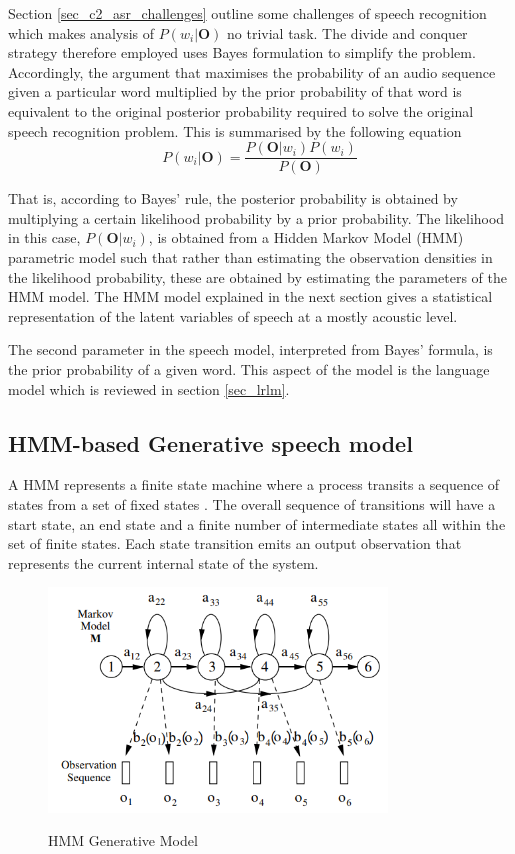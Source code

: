 Section \ref{sec_c2_asr_challenges} outline some challenges of  speech recognition which makes  analysis of $P(w_i|\mathbf{O})$ no trivial task.  The divide and conquer strategy therefore employed uses Bayes formulation to simplify the problem.  Accordingly, the argument that maximises the probability of an audio sequence given a particular word multiplied by the prior probability of that word is equivalent to the original posterior probability required to solve the original speech recognition problem. This is summarised by the following equation
\begin{equation}P(w_i|\mathbf{O})=\frac{P(\mathbf{O}|w_i)P(w_i)}{P(\mathbf{O})}
\label{eqn_2_3_bayes_sr}
\end{equation}

That is, according to Bayes’ rule, the posterior probability is obtained by multiplying a certain likelihood probability by a prior probability.  The likelihood in this case, $P(\mathbf{O}|w_i)$, is obtained from a Hidden Markov Model (HMM) parametric model such that rather than estimating the observation densities in the likelihood probability, these are obtained by estimating the parameters of the HMM model.  The HMM model explained in the next section gives a statistical representation of the latent variables of speech at a mostly acoustic level.

The second parameter in the speech model, interpreted from Bayes' formula, is the prior probability of a given word.  This aspect of the model is the language model which is reviewed in section \ref{sec_lrlm}.

\subsection{HMM-based Generative speech model}
A HMM represents a finite state machine where a process transits a sequence of states from a set of fixed states \citep{gales2008application, young2002htk}. The overall sequence of transitions will have a start state, an end state and a finite number of intermediate states all within the set of finite states.  Each state transition emits an output observation that represents the current internal state of the system.

\begin{figure}
\centering
  \includegraphics[width=9cm]{thesis/images/hmm}\\
  \caption{HMM Generative Model}\cite{young2002htk}\label{fig_2_1_hmm}
\end{figure}

